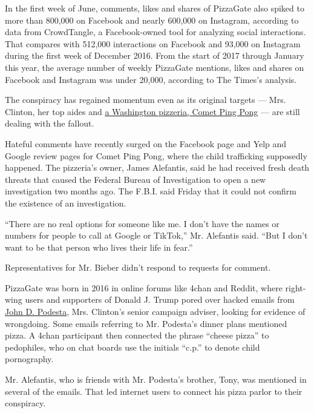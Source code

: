 In the first week of June, comments, likes and shares of PizzaGate also
spiked to more than 800,000 on Facebook and nearly 600,000 on Instagram,
according to data from CrowdTangle, a Facebook-owned tool for analyzing
social interactions. That compares with 512,000 interactions on Facebook
and 93,000 on Instagram during the first week of December 2016. From the
start of 2017 through January this year, the average number of weekly
PizzaGate mentions, likes and shares on Facebook and Instagram was under
20,000, according to The Times's analysis.

The conspiracy has regained momentum even as its original targets ---
Mrs. Clinton, her top aides and
\href{https://www.nytimes.com/2016/11/21/technology/fact-check-this-pizzeria-is-not-a-child-trafficking-site.html}{a
Washington pizzeria, Comet Ping Pong} --- are still dealing with the
fallout.

Hateful comments have recently surged on the Facebook page and Yelp and
Google review pages for Comet Ping Pong, where the child trafficking
supposedly happened. The pizzeria's owner, James Alefantis, said he had
received fresh death threats that caused the Federal Bureau of
Investigation to open a new investigation two months ago. The F.B.I.
said Friday that it could not confirm the existence of an investigation.

``There are no real options for someone like me. I don't have the names
or numbers for people to call at Google or TikTok,'' Mr. Alefantis said.
``But I don't want to be that person who lives their life in fear.''

Representatives for Mr. Bieber didn't respond to requests for comment.

PizzaGate was born in 2016 in online forums like 4chan and Reddit, where
right-wing users and supporters of Donald J. Trump pored over hacked
emails from
\href{https://www.google.com/search?q=john+podesta+nytimes\&rlz=1C5GCEA_enUS903US903\&oq=john+podesta+nytimes\&aqs=chrome..69i57j33l2.2235j0j4\&sourceid=chrome\&ie=UTF-8}{John
D. Podesta}, Mrs. Clinton's senior campaign adviser, looking for
evidence of wrongdoing. Some emails referring to Mr. Podesta's dinner
plans mentioned pizza. A 4chan participant then connected the phrase
``cheese pizza'' to pedophiles, who on chat boards use the initials
``c.p.'' to denote child pornography.

Mr. Alefantis, who is friends with Mr. Podesta's brother, Tony, was
mentioned in several of the emails. That led internet users to connect
his pizza parlor to their conspiracy.

